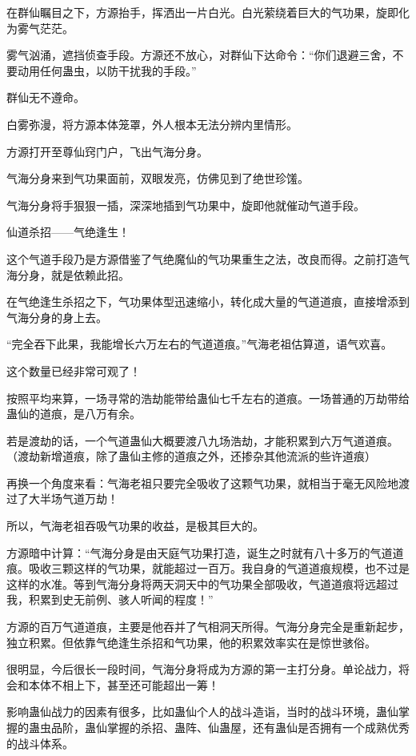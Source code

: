 \begin{this_body}
在群仙瞩目之下，方源抬手，挥洒出一片白光。白光萦绕着巨大的气功果，旋即化为雾气茫茫。

雾气汹涌，遮挡侦查手段。方源还不放心，对群仙下达命令：“你们退避三舍，不要动用任何蛊虫，以防干扰我的手段。”

群仙无不遵命。

白雾弥漫，将方源本体笼罩，外人根本无法分辨内里情形。

方源打开至尊仙窍门户，飞出气海分身。

气海分身来到气功果面前，双眼发亮，仿佛见到了绝世珍馐。

气海分身将手狠狠一插，深深地插到气功果中，旋即他就催动气道手段。

仙道杀招——气绝逢生！

这个气道手段乃是方源借鉴了气绝魔仙的气功果重生之法，改良而得。之前打造气海分身，就是依赖此招。

在气绝逢生杀招之下，气功果体型迅速缩小，转化成大量的气道道痕，直接增添到气海分身的身上去。

“完全吞下此果，我能增长六万左右的气道道痕。”气海老祖估算道，语气欢喜。

这个数量已经非常可观了！

按照平均来算，一场寻常的浩劫能带给蛊仙七千左右的道痕。一场普通的万劫带给蛊仙的道痕，是八万有余。

若是渡劫的话，一个气道蛊仙大概要渡八九场浩劫，才能积累到六万气道道痕。（渡劫新增道痕，除了蛊仙主修的道痕之外，还掺杂其他流派的些许道痕）

再换一个角度来看：气海老祖只要完全吸收了这颗气功果，就相当于毫无风险地渡过了大半场气道万劫！

所以，气海老祖吞吸气功果的收益，是极其巨大的。

方源暗中计算：“气海分身是由天庭气功果打造，诞生之时就有八十多万的气道道痕。吸收三颗这样的气功果，就能超过一百万。我自身的气道道痕规模，也不过是这样的水准。等到气海分身将两天洞天中的气功果全部吸收，气道道痕将远超过我，积累到史无前例、骇人听闻的程度！”

方源的百万气道道痕，主要是他吞并了气相洞天所得。气海分身完全是重新起步，独立积累。但依靠气绝逢生杀招和气功果，他的积累效率实在是惊世骇俗。

很明显，今后很长一段时间，气海分身将成为方源的第一主打分身。单论战力，将会和本体不相上下，甚至还可能超出一筹！

影响蛊仙战力的因素有很多，比如蛊仙个人的战斗造诣，当时的战斗环境，蛊仙掌握的蛊虫品阶，蛊仙掌握的杀招、蛊阵、仙蛊屋，还有蛊仙是否拥有一个成熟优秀的战斗体系。


\end{this_body}
